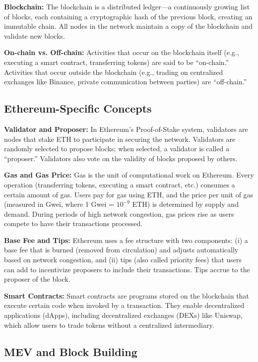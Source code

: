\documentclass[12pt,reqno]{amsart}
\begin{document}
\textbf{Blockchain:} The blockchain is a distributed ledger---a continuously growing list of blocks, each containing a cryptographic hash of the previous block, creating an immutable chain. All nodes in the network maintain a copy of the blockchain and validate new blocks.

\textbf{On-chain vs. Off-chain:} Activities that occur on the blockchain itself (e.g., executing a smart contract, transferring tokens) are said to be ``on-chain.'' Activities that occur outside the blockchain (e.g., trading on centralized exchanges like Binance, private communication between parties) are ``off-chain.''

\subsection{Ethereum-Specific Concepts}

\textbf{Validator and Proposer:} In Ethereum's Proof-of-Stake system, validators are nodes that stake ETH to participate in securing the network. Validators are randomly selected to propose blocks; when selected, a validator is called a ``proposer.'' Validators also vote on the validity of blocks proposed by others.

\textbf{Gas and Gas Price:} Gas is the unit of computational work on Ethereum. Every operation (transferring tokens, executing a smart contract, etc.) consumes a certain amount of gas. Users pay for gas using ETH, and the price per unit of gas (measured in Gwei, where 1 Gwei = $10^{-9}$ ETH) is determined by supply and demand. During periods of high network congestion, gas prices rise as users compete to have their transactions processed.

\textbf{Base Fee and Tips:} Ethereum uses a fee structure with two components: (i) a base fee that is burned (removed from circulation) and adjusts automatically based on network congestion, and (ii) tips (also called priority fees) that users can add to incentivize proposers to include their transactions. Tips accrue to the proposer of the block.

\textbf{Smart Contracts:} Smart contracts are programs stored on the blockchain that execute certain code when invoked by a transaction. They enable decentralized applications (dApps), including decentralized exchanges (DEXs) like Uniswap, which allow users to trade tokens without a centralized intermediary.

\subsection{MEV and Block Building}
\end{document}
